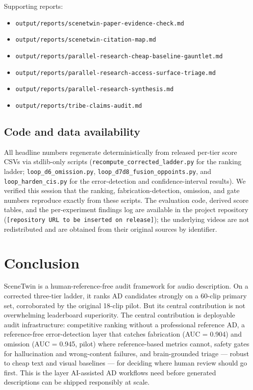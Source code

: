 \documentclass[10pt,twocolumn]{article}
\begin{document}
Supporting reports:


\begin{itemize}[leftmargin=*]
\item \texttt{output/reports/scenetwin-paper-evidence-check.md}
\item \texttt{output/reports/scenetwin-citation-map.md}
\item \texttt{output/reports/parallel-research-cheap-baseline-gauntlet.md}
\item \texttt{output/reports/parallel-research-access-surface-triage.md}
\item \texttt{output/reports/parallel-research-synthesis.md}
\item \texttt{output/reports/tribe-claims-audit.md}
\end{itemize}

\subsection{Code and data availability}

All headline numbers regenerate deterministically from released per-tier score CSVs via
stdlib-only scripts (\texttt{recompute\_corrected\_ladder.py} for the ranking ladder;
\texttt{loop\_d6\_omission.py}, \texttt{loop\_d7d8\_fusion\_oppoints.py}, and
\texttt{loop\_harden\_cis.py} for the error-detection and confidence-interval results). We
verified this session that the ranking, fabrication-detection, omission, and gate numbers
reproduce exactly from these scripts. The evaluation code, derived score tables, and the
per-experiment findings log are available in the project repository
(\texttt{[repository URL to be inserted on release]}); the underlying videos are not
redistributed and are obtained from their original sources by identifier.

\section{Conclusion}


SceneTwin is a human-reference-free audit framework for audio description. On a corrected three-tier ladder, it ranks AD candidates strongly on a 60-clip primary set, corroborated by the original 18-clip pilot. But its central contribution is not overwhelming leaderboard superiority. The central contribution is deployable audit infrastructure: competitive ranking without a professional reference AD, a reference-free error-detection layer that catches fabrication (AUC = 0.904) and omission (AUC = 0.945, pilot) where reference-based metrics cannot, safety gates for hallucination and wrong-content failures, and brain-grounded triage --- robust to cheap text and visual baselines --- for deciding where human review should go first. This is the layer AI-assisted AD workflows need before generated descriptions can be shipped responsibly at scale.
\end{document}
